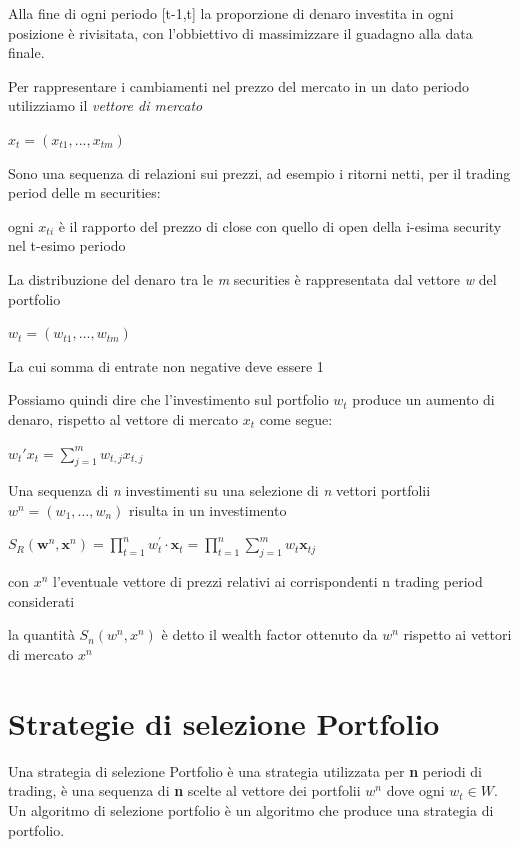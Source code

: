 \documentclass[a4paper,11pt]{report}
\begin{document}
{	Alla fine di ogni periodo [t-1,t] la proporzione di denaro investita in ogni posizione è rivisitata, con l'obbiettivo di massimizzare il guadagno alla data finale.

	Per rappresentare i cambiamenti nel prezzo del mercato in un dato periodo utilizziamo il \emph{vettore di mercato}
\begin{center}
	$x_t=(x_{t1},...,x_{tm})$
\end{center}
	Sono una sequenza di relazioni sui prezzi, ad esempio i ritorni netti, per il trading period delle m securities:

	ogni $x_{ti}$ è il rapporto del prezzo di close con quello di open della i-esima security nel t-esimo periodo

	La distribuzione del denaro tra le \emph{m} securities è rappresentata dal vettore \emph{w} del portfolio
\begin{center}
	$w_t=(w_{t1},...,w_{tm})$
\end{center}
	La cui somma di entrate non negative deve essere 1

	Possiamo quindi dire che l'investimento sul portfolio \textbf{$w_t$} produce un aumento di denaro, rispetto al vettore di mercato $x_t$ come segue:

\begin{center}
	$w_t' x_t = \sum\limits_{j=1}^m w_{t,j}x_{t,j}$
\end{center}
	Una sequenza di \emph{n} investimenti su una selezione di \emph{n} vettori portfolii $w^n=(w_1,...,w_n)$ risulta in un investimento
\begin{center}$
	S _ { R } \left( \boldsymbol { w } ^ { n } , \boldsymbol { x } ^ { n } \right) = \prod _ { t = 1 } ^ { n } w _ { t } ^ { \prime } \cdot \boldsymbol { x } _ { t } = \prod _ { t = 1 } ^ { n } \sum _ { j = 1 } ^ { m } w _ { t } \boldsymbol { x } _ { t j }$
\end{center}

	con $x^n$ l'eventuale vettore di prezzi relativi ai corrispondenti n trading period considerati

	la quantità $S_n(w^n,x^n)$ è detto il wealth factor ottenuto da $w^n$ rispetto ai vettori di mercato $x^n$

\section{Strategie di selezione Portfolio}
	Una strategia di selezione Portfolio è una strategia utilizzata per \textbf{n} periodi di trading, è una sequenza di \textbf{n} scelte al vettore dei portfolii $w^n$ dove ogni $w_t\in W$. Un algoritmo di selezione portfolio è un algoritmo che produce una strategia di portfolio.

}
\end{document}
